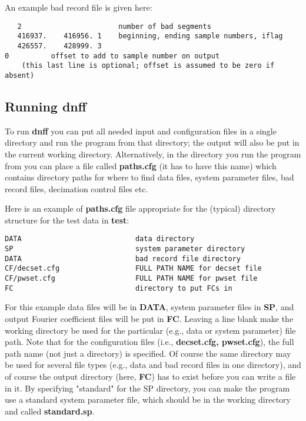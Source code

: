 An example bad record file is given here:
\small

\begin{verbatim}
   2                       number of bad segments
   416937.    416956. 1    beginning, ending sample numbers, iflag
   426557.    428999. 3
0          offset to add to sample number on output
    (this last line is optional; offset is assumed to be zero if absent)
\end{verbatim}
\normalsize

\subsection{Running dnff}

To run {\bf dnff} you can put all needed input and configuration
files in a single directory and run the program from that
directory;  the output will also be put in the
current working directory.
Alternatively,
in the directory you run the program from you can
place a file called {\bf paths.cfg}
(it has to have this name) which contains
directory paths for where to find data files,
system parameter files, bad record files, decimation control
files etc.

Here is an example of {\bf paths.cfg} file appropriate for
the (typical) directory structure for the test data in {\bf test}:
\small

\begin{verbatim}
DATA                           data directory
SP                             system parameter directory
DATA                           bad record file directory
CF/decset.cfg                  FULL PATH NAME for decset file
CF/pwset.cfg                   FULL PATH NAME for pwset file
FC                             directory to put FCs in
\end{verbatim}
\normalsize

For this example data files will be in {\bf DATA},
system parameter files in {\bf SP}, and output Fourier coefficient
files  will be put in {\bf FC}.
Leaving a line blank make the working directory be used for
the particular (e.g., data or system parameter) file path.
Note that for the configuration files
(i.e., {\bf decset.cfg, pwset.cfg}), 
the full path name (not just a directory)
is specified.  Of course the same directory may be used for several file
types (e.g., data and bad record files in one directory),
and of course the output directory (here, {\bf FC})
has to exist before you can write a file in it. 
By specifying "standard" for the SP directory, you can make the
program use a standard system parameter file, which should be
in the working directory and called {\bf standard.sp}.

